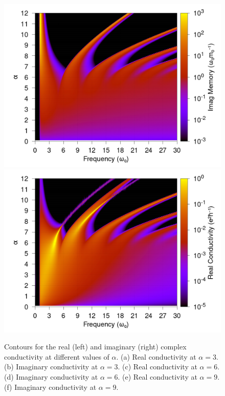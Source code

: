 \begin{figure}[t]
    \centering
    \includegraphics[width=.49\textwidth]{figures/frohlich-3d-imag-memory-alpha-0to12-temp-001-freq-0to30-contourf.png}
    \includegraphics[width=.49\textwidth]{figures/frohlich-3d-real-conductivity-alpha-0to12-temp-001-freq-0to30-contourf.png}
    \caption{Contours for the real (left) and imaginary (right) complex conductivity at different values of $\alpha$. (a) Real conductivity at $\alpha = 3$. (b) Imaginary conductivity at $\alpha = 3$. (c) Real conductivity at $\alpha = 6$. (d) Imaginary conductivity at $\alpha = 6$. (e) Real conductivity at $\alpha = 9$. (f) Imaginary conductivity at $\alpha = 9$.}
    \label{fig:gscontour}
\end{figure}

